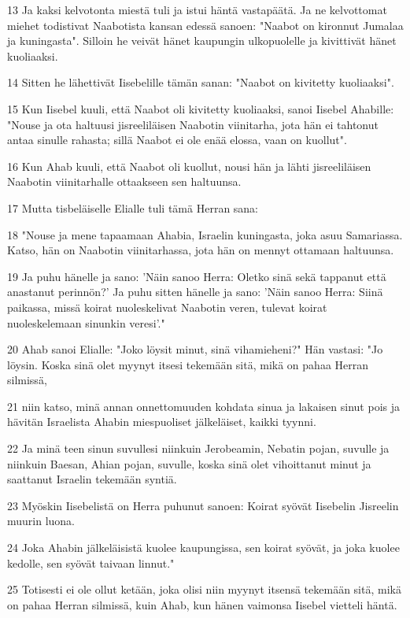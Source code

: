 \par 13 Ja kaksi kelvotonta miestä tuli ja istui häntä vastapäätä. Ja ne kelvottomat miehet todistivat Naabotista kansan edessä sanoen: "Naabot on kironnut Jumalaa ja kuningasta". Silloin he veivät hänet kaupungin ulkopuolelle ja kivittivät hänet kuoliaaksi.
\par 14 Sitten he lähettivät Iisebelille tämän sanan: "Naabot on kivitetty kuoliaaksi".
\par 15 Kun Iisebel kuuli, että Naabot oli kivitetty kuoliaaksi, sanoi Iisebel Ahabille: "Nouse ja ota haltuusi jisreeliläisen Naabotin viinitarha, jota hän ei tahtonut antaa sinulle rahasta; sillä Naabot ei ole enää elossa, vaan on kuollut".
\par 16 Kun Ahab kuuli, että Naabot oli kuollut, nousi hän ja lähti jisreeliläisen Naabotin viinitarhalle ottaakseen sen haltuunsa.
\par 17 Mutta tisbeläiselle Elialle tuli tämä Herran sana:
\par 18 "Nouse ja mene tapaamaan Ahabia, Israelin kuningasta, joka asuu Samariassa. Katso, hän on Naabotin viinitarhassa, jota hän on mennyt ottamaan haltuunsa.
\par 19 Ja puhu hänelle ja sano: 'Näin sanoo Herra: Oletko sinä sekä tappanut että anastanut perinnön?' Ja puhu sitten hänelle ja sano: 'Näin sanoo Herra: Siinä paikassa, missä koirat nuoleskelivat Naabotin veren, tulevat koirat nuoleskelemaan sinunkin veresi'."
\par 20 Ahab sanoi Elialle: "Joko löysit minut, sinä vihamieheni?" Hän vastasi: "Jo löysin. Koska sinä olet myynyt itsesi tekemään sitä, mikä on pahaa Herran silmissä,
\par 21 niin katso, minä annan onnettomuuden kohdata sinua ja lakaisen sinut pois ja hävitän Israelista Ahabin miespuoliset jälkeläiset, kaikki tyynni.
\par 22 Ja minä teen sinun suvullesi niinkuin Jerobeamin, Nebatin pojan, suvulle ja niinkuin Baesan, Ahian pojan, suvulle, koska sinä olet vihoittanut minut ja saattanut Israelin tekemään syntiä.
\par 23 Myöskin Iisebelistä on Herra puhunut sanoen: Koirat syövät Iisebelin Jisreelin muurin luona.
\par 24 Joka Ahabin jälkeläisistä kuolee kaupungissa, sen koirat syövät, ja joka kuolee kedolle, sen syövät taivaan linnut."
\par 25 Totisesti ei ole ollut ketään, joka olisi niin myynyt itsensä tekemään sitä, mikä on pahaa Herran silmissä, kuin Ahab, kun hänen vaimonsa Iisebel vietteli häntä.
